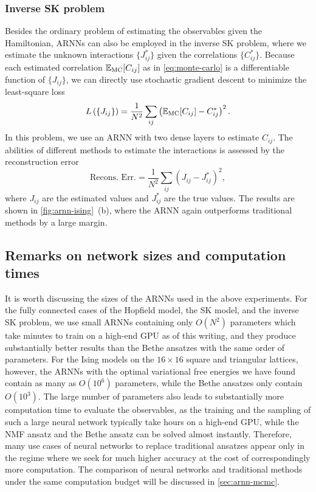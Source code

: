 \subsubsection{Inverse SK problem}

Besides the ordinary problem of estimating the observables given the Hamiltonian, ARNNs can also be employed in the inverse SK problem, where we estimate the unknown interactions $\{J^*_{i j}\}$ given the correlations $\{C^*_{i j}\}$. Because each estimated correlation $\mathbb{E}_\text{MC}[C_{i j}]$ as in \cref{eq:monte-carlo} is a differentiable function of $\{J_{i j}\}$, we can directly use stochastic gradient descent to minimize the least-square loss
\begin{equation}
L\left( \{J_{i j}\} \right) = \frac{1}{N^2} \sum_{i j} \left( \mathbb{E}_\text{MC}[C_{i j}] - C^*_{i j} \right)^2.
\end{equation}
In this problem, we use an ARNN with two dense layers to estimate $C_{i j}$. The abilities of different methods to estimate the interactions is assessed by the reconstruction error
\begin{equation}
\text{Recons. Err.} = \frac{1}{N^2} \sum_{i j} \left( J_{i j} - J^*_{i j} \right)^2,
\end{equation}
where $J_{i j}$ are the estimated values and $J^*_{i j}$ are the true values. The results are shown in \cref{fig:arnn-ising}~(b), where the ARNN again outperforms traditional methods by a large margin.

\subsection{Remarks on network sizes and computation times}

It is worth discussing the sizes of the ARNNs used in the above experiments. For the fully connected cases of the Hopfield model, the SK model, and the inverse SK problem, we use small ARNNs containing only $O(N^2)$ parameters which take minutes to train on a high-end GPU as of this writing, and they produce substantially better results than the Bethe ansatzes with the same order of parameters. For the Ising models on the $16 \times 16$ square and triangular lattices, however, the ARNNs with the optimal variational free energies we have found contain as many as $O(10^6)$ parameters, while the Bethe ansatzes only contain $O(10^3)$. The large number of parameters also leads to substantially more computation time to evaluate the observables, as the training and the sampling of such a large neural network typically take hours on a high-end GPU, while the NMF ansatz and the Bethe ansatz can be solved almost instantly. Therefore, many use cases of neural networks to replace traditional ansatzes appear only in the regime where we seek for much higher accuracy at the cost of correspondingly more computation. The comparison of neural networks and traditional methods under the same computation budget will be discussed in \cref{sec:arnn-mcmc}.

